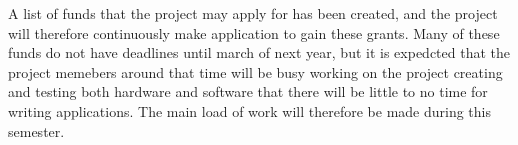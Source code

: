 A list of funds that the project may apply for has been created, and the project will therefore continuously make application to gain these grants. Many of these funds do not have deadlines 
until  march of next year, but it is expedcted that the project memebers around that time will be busy working on the project creating and testing both hardware and software that 
there will be little to no time for writing applications. The main load of work will therefore be made during this semester.


